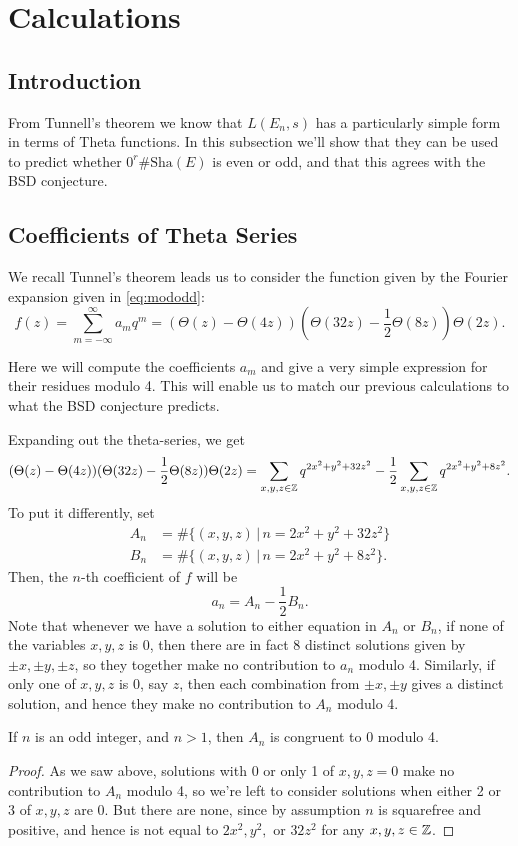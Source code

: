\documentclass[12pt, a4paper]{amsart}
\begin{document}
\section{Calculations}

\subsection{Introduction}

From Tunnell's theorem we know that $L(E_n,s)$ has a particularly simple
form in terms of Theta functions. In this subsection we'll show that they
can be used to predict whether $0^r \#\text{Sha}(E)$ is even or odd, and that
this agrees with the BSD conjecture.


\subsection{Coefficients of Theta Series}
We recall Tunnel's theorem leads us to consider the function given by the
Fourier expansion given in \autoref{eq:mododd}:
\[
  f(z) = \sum\limits_{m=-\infty}^\infty a_m q^m
  = (\Theta(z) - \Theta(4z)) \left(\Theta(32z)-\frac{1}{2} \Theta(8z)\right) \Theta(2z).
\]

Here we will compute the coefficients $a_m$ and give a very simple expression for
their residues modulo 4. This will enable us to match our previous calculations
to what the BSD conjecture predicts.

Expanding out the theta-series, we get
\[
    (\Theta(z) - \Theta(4z)) (\Theta(32z)-\frac{1}{2} \Theta(8z)) \Theta(2z)
    = \sum\limits_{x, y, z \in {\mathbb Z}} q^{2x^2+y^2+32z^2} - \frac{1}{2}
    \sum\limits_{x,y,z \in {\mathbb Z}} q^{2x^2+y^2+8z^2}.
\]
To put it differently, set
\begin{equation*}
  \begin{split}
    A_n &= \#\{(x,y,z) \,|\, n = 2x^2 + y^2 + 32z^2\} \\
    B_n &= \#\{(x,y,z) \,|\, n = 2x^2 + y^2 + 8z^2\}.
  \end{split}
\end{equation*}
Then, the $n$-th coefficient of $f$ will be
\[a_n = A_n - \frac{1}{2}B_n.\]
Note that whenever we have a solution to either equation in $A_n$ or $B_n$,
if none of the variables $x,y,z$ is 0, then there are in fact 8 distinct
solutions given by
$\pm x, \pm y, \pm z$, so they together make no contribution to $a_n$ modulo 4.
Similarly, if only one of $x,y,z$ is 0, say $z$, then each combination from
$\pm x, \pm y$ gives a distinct solution, and hence they make no contribution
to $A_n$ modulo 4.
\begin{lemma}
  If $n$ is an odd integer, and $n > 1$, then $A_n$ is congruent to 0 modulo 4.
\end{lemma}
\begin{proof}
  As we saw above, solutions with 0 or only 1 of $x,y,z = 0$ make no
  contribution to $A_n$ modulo 4, so we're left to consider solutions when
  either 2 or 3 of $x,y,z$ are 0.
  But there are none, since by assumption $n$ is squarefree and positive, and
  hence is not equal to $2x^2, y^2, $ or $32z^2$ for any $x,y,z \in {\mathbb Z}$.
\end{proof}
\end{document}

